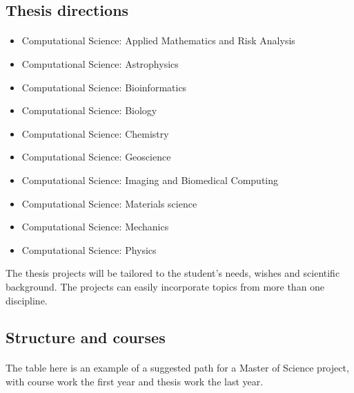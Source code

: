 \documentclass[%
oneside,                 %
final,                   %
10pt]{article}
\begin{document}
\subsection{Thesis directions}

\paragraph{}

\begin{itemize}
\item Computational Science: Applied Mathematics and Risk Analysis

\item Computational Science: Astrophysics

\item Computational Science: Bioinformatics

\item Computational Science: Biology

\item Computational Science: Chemistry

\item Computational Science: Geoscience

\item Computational Science: Imaging and Biomedical Computing

\item Computational Science: Materials science

\item Computational Science: Mechanics

\item Computational Science: Physics
\end{itemize}

\noindent
The thesis projects will be tailored to the student's needs, wishes and scientific background. The projects can easily incorporate topics from more than one discipline.



\subsection{Structure and courses}

\paragraph{}
The table here is an example of a suggested path for a Master of Science project,
with course work the first year and thesis work the last year.
\end{document}
